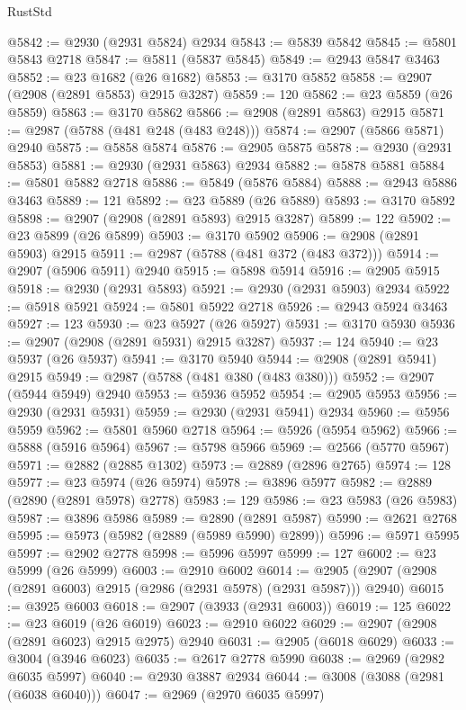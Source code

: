 \begin{lexlean}{RustStd}
\begin{coremodule}
@5842 := @2930 (@2931 @5824) @2934
@5843 := @5839 @5842
@5845 := @5801 @5843 @2718
@5847 := @5811 (@5837 @5845)
@5849 := @2943 @5847 @3463
@5852 := @23 @1682 (@26 @1682)
@5853 := @3170 @5852
@5858 := @2907 (@2908 (@2891 @5853) @2915 @3287)
@5859 := 120
@5862 := @23 @5859 (@26 @5859)
@5863 := @3170 @5862
@5866 := @2908 (@2891 @5863) @2915
@5871 := @2987 (@5788 (@481 @248 (@483 @248)))
@5874 := @2907 (@5866 @5871) @2940
@5875 := @5858 @5874
@5876 := @2905 @5875
@5878 := @2930 (@2931 @5853)
@5881 := @2930 (@2931 @5863) @2934
@5882 := @5878 @5881
@5884 := @5801 @5882 @2718
@5886 := @5849 (@5876 @5884)
@5888 := @2943 @5886 @3463
@5889 := 121
@5892 := @23 @5889 (@26 @5889)
@5893 := @3170 @5892
@5898 := @2907 (@2908 (@2891 @5893) @2915 @3287)
@5899 := 122
@5902 := @23 @5899 (@26 @5899)
@5903 := @3170 @5902
@5906 := @2908 (@2891 @5903) @2915
@5911 := @2987 (@5788 (@481 @372 (@483 @372)))
@5914 := @2907 (@5906 @5911) @2940
@5915 := @5898 @5914
@5916 := @2905 @5915
@5918 := @2930 (@2931 @5893)
@5921 := @2930 (@2931 @5903) @2934
@5922 := @5918 @5921
@5924 := @5801 @5922 @2718
@5926 := @2943 @5924 @3463
@5927 := 123
@5930 := @23 @5927 (@26 @5927)
@5931 := @3170 @5930
@5936 := @2907 (@2908 (@2891 @5931) @2915 @3287)
@5937 := 124
@5940 := @23 @5937 (@26 @5937)
@5941 := @3170 @5940
@5944 := @2908 (@2891 @5941) @2915
@5949 := @2987 (@5788 (@481 @380 (@483 @380)))
@5952 := @2907 (@5944 @5949) @2940
@5953 := @5936 @5952
@5954 := @2905 @5953
@5956 := @2930 (@2931 @5931)
@5959 := @2930 (@2931 @5941) @2934
@5960 := @5956 @5959
@5962 := @5801 @5960 @2718
@5964 := @5926 (@5954 @5962)
@5966 := @5888 (@5916 @5964)
@5967 := @5798 @5966
@5969 := @2566 (@5770 @5967)
@5971 := @2882 (@2885 @1302)
@5973 := @2889 (@2896 @2765)
@5974 := 128
@5977 := @23 @5974 (@26 @5974)
@5978 := @3896 @5977
@5982 := @2889 (@2890 (@2891 @5978) @2778)
@5983 := 129
@5986 := @23 @5983 (@26 @5983)
@5987 := @3896 @5986
@5989 := @2890 (@2891 @5987)
@5990 := @2621 @2768
@5995 := @5973 (@5982 (@2889 (@5989 @5990) @2899))
@5996 := @5971 @5995
@5997 := @2902 @2778
@5998 := @5996 @5997
@5999 := 127
@6002 := @23 @5999 (@26 @5999)
@6003 := @2910 @6002
@6014 := @2905 (@2907 (@2908 (@2891 @6003) @2915 (@2986 (@2931 @5978) (@2931 @5987))) @2940)
@6015 := @3925 @6003
@6018 := @2907 (@3933 (@2931 @6003))
@6019 := 125
@6022 := @23 @6019 (@26 @6019)
@6023 := @2910 @6022
@6029 := @2907 (@2908 (@2891 @6023) @2915 @2975) @2940
@6031 := @2905 (@6018 @6029)
@6033 := @3004 (@3946 @6023)
@6035 := @2617 @2778 @5990
@6038 := @2969 (@2982 @6035 @5997)
@6040 := @2930 @3887 @2934
@6044 := @3008 (@3088 (@2981 (@6038 @6040)))
@6047 := @2969 (@2970 @6035 @5997)

\end{coremodule}
\end{lexlean}
